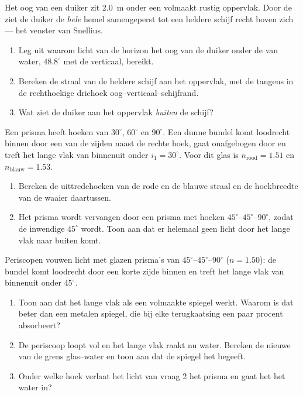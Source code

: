 \begin{exercise}[$\star\star\star$]\label{exo:g10:refraction:12}
Het oog van een duiker zit \qty{2.0}{m} onder een volmaakt rustig
oppervlak. Door de  ziet de duiker de \emph{hele} hemel
samengeperst tot een heldere schijf recht boven zich --- het venster van
Snellius.
\begin{enumerate}
  \item Leg uit waarom licht van de horizon het oog van de duiker onder
        de  van water, $48.8^\circ$ met de verticaal, bereikt.
  \item Bereken de straal van de heldere schijf aan het oppervlak, met de
        tangens in de rechthoekige driehoek oog--verticaal--schijfrand.
  \item Wat ziet de duiker aan het oppervlak \emph{buiten} de schijf?
\end{enumerate}
\end{exercise}

\begin{exercise}[$\star\star\star$]\label{exo:g10:refraction:13}
Een prisma heeft hoeken van $30^\circ$, $60^\circ$ en $90^\circ$. Een
dunne bundel  komt loodrecht binnen door een van de zijden naast
de rechte hoek, gaat onafgebogen door en treft het lange vlak van
binnenuit onder $i_1 = 30^\circ$. Voor dit glas is $n_{\text{rood}} =
1.51$ en $n_{\text{blauw}} = 1.53$.
\begin{enumerate}
  \item Bereken de uittredehoeken van de rode en de blauwe straal en de
        hoekbreedte van de waaier daartussen.
  \item Het prisma wordt vervangen door een prisma met hoeken
        $45^\circ$--$45^\circ$--$90^\circ$, zodat de inwendige 
        $45^\circ$ wordt. Toon aan dat er helemaal geen licht door het
        lange vlak naar buiten komt.
\end{enumerate}
\end{exercise}

\begin{exercise}[$\star\star\star$]\label{exo:g10:refraction:14}
Periscopen vouwen licht met glazen prisma's van
$45^\circ$--$45^\circ$--$90^\circ$ ($n = 1.50$): de bundel komt loodrecht
door een korte zijde binnen en treft het lange vlak van binnenuit onder
$45^\circ$.
\begin{enumerate}
  \item Toon aan dat het lange vlak als een volmaakte spiegel werkt.
        Waarom is dat beter dan een metalen spiegel, die bij elke
        terugkaatsing een paar procent absorbeert?
  \item De periscoop loopt vol en het lange vlak raakt nu water.
        Bereken de nieuwe  van de grens glas--water en toon aan
        dat de spiegel het begeeft.
  \item Onder welke hoek verlaat het licht van vraag 2 het prisma en gaat
        het het water in?
\end{enumerate}
\end{exercise}

